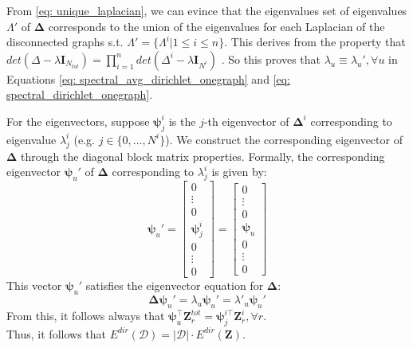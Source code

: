 From \ref{eq: unique_laplacian}, we can evince that the eigenvalues set of eigenvalues $\Lambda'$ of $\mathbf{\Delta}$ corresponds to the union of the eigenvalues for each Laplacian of the disconnected graphs s.t. $\Lambda' = \{\Lambda^i| 1 \leq i \leq n\}$. This derives from the property that $det(\Delta - \lambda\mathbf{I}_{N_{tot}}) = \prod_{i = 1}^n det(\Delta^i - \lambda\mathbf{I}_{N^i})$ \cite{linear_algebra}. So this proves that $\lambda_u \equiv \lambda_u', \forall u$ in Equations \ref{eq: spectral_avg_dirichlet_onegraph} and \ref{eq: spectral_dirichlet_onegraph}. 

For the eigenvectors, suppose $\bm{\psi}_j^i$ is the $j$-th eigenvector of $\mathbf{\Delta}^i$ corresponding to eigenvalue \( \lambda_j^i \) (e.g. $j \in \{0, \ldots, N^i\}$). We construct the corresponding eigenvector of $\mathbf{\Delta}$ through the diagonal block matrix properties. Formally, the corresponding eigenvector $\bm{\psi}_u'$ of $\mathbf{\Delta}$ corresponding to \( \lambda_j^i \) is given by:
\[
\bm{\psi}_u' = \begin{bmatrix}
0 \\
\vdots \\
0 \\
\bm{\psi}_j^{i} \\
0 \\
\vdots \\
0
\end{bmatrix} = \begin{bmatrix}
0 \\
\vdots \\
0 \\
\bm{\psi}_u \\
0 \\
\vdots \\
0
\end{bmatrix}
\]
This vector $\bm{\psi}_u'$ satisfies the eigenvector equation for $\mathbf{\Delta}$:
\[
\mathbf{\Delta} \bm{\psi}_u' = \lambda_u \bm{\psi}_u' = \lambda'_u \bm{\psi}_u'
\]
From this, it follows always that $\bm{\psi}_u^{\top} \mathbf{Z}^{tot}_{r} = \bm{\psi}_j^{i\top} \mathbf{Z}^{i}_{r}, \forall r$. \\Thus, it follows that $E^{dir}(\mathcal{D}) = |\mathcal{D}| \cdot E^{dir}(\mathbf{Z})$.







